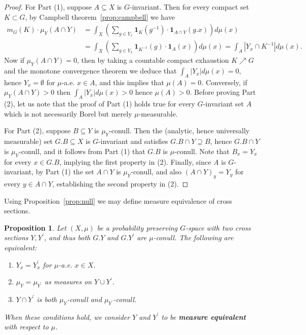 \documentclass{amsart}
\numberwithin{equation}{subsection}
\newtheorem{prop}[thm]{Proposition}
\theoremstyle{remark}
\begin{document}
\begin{proof}
For Part (1), suppose \(A\subseteq X\) is \(G\)-invariant. Then for every compact set \(K\subset G\), by Campbell theorem~\ref{prop:campbell} we have
\begin{align*}
m_{G}\left(K\right)\cdot\mu_{Y}\left(A\cap Y\right)	
&=\int_{X}\left(\sum\nolimits_{g\in Y_{x}}\mathbf{1}_{K}\left(g^{-1}\right)\cdot\mathbf{1}_{A\cap Y}\left(g.x\right)\right)d\mu\left(x\right)\\
&=\int_{X}\left(\sum\nolimits_{g\in Y_{x}}\mathbf{1}_{K^{-1}}\left(g\right)\cdot\mathbf{1}_{A}\left(x\right)\right)d\mu\left(x\right)=\int_{A}\left|Y_{x}\cap K^{-1}\right|d\mu\left(x\right).
\end{align*}
Now if \(\mu_{Y}\left(A\cap Y\right)=0\), then by taking a countable compact exhaustion \(K\nearrow G\) and the monotone convergence theorem we deduce that \(\int_{A}\left|Y_{x}\right|d\mu\left(x\right)=0\), hence \(Y_{x}=\emptyset\) for \(\mu\)-a.e. \(x\in A\), and this implies that \(\mu\left(A\right)=0\). Conversely, if \(\mu_{Y}\left(A\cap Y\right)>0\) then \(\int_{A}\left|Y_{x}\right|d\mu\left(x\right)>0\) hence \(\mu\left(A\right)>0\). Before proving Part (2), let us note that the proof of Part (1) holds true for every \(G\)-invariant set \(A\) which is not necessarily Borel but merely \(\mu\)-measurable.

For Part (2), suppose \(B\subseteq Y\) is \(\mu_{Y}\)-conull. Then the (analytic, hence universally measurable) set \(G.B\subseteq X\) is \(G\)-invariant and satisfies \(G.B\cap Y\supseteq B\), hence \(G.B\cap Y\) is \(\mu_{Y}\)-conull, and it follows from Part (1) that \(G.B\) is \(\mu\)-conull.  Note that \(B_{x}=Y_{x}\) for every \(x\in G.B\), implying the first property in (2). Finally, since \(A\) is \(G\)-invariant, by Part (1) the set \(A\cap Y\) is \(\mu_{Y}\)-conull, and also \(\left(A\cap Y\right)_{y}=Y_{y}\) for every \(y\in A\cap Y\), establishing the second property in (2).
\end{proof}

Using Proposition~\ref{prop:null} we may define measure equivalence of cross sections.

\begin{prop}\label{prop:crossequiv}
Let \(\left(X,\mu\right)\) be a probability preserving \(G\)-space with two cross sections \(Y,Y^{\prime}\), and thus both \(G.Y\) and \(G.Y^{\prime}\) are \(\mu\)-conull. The following are equivalent:
\begin{enumerate}
    \item \(Y_{x}=Y_{x}^{\prime}\) for \(\mu\)-a.e. \(x\in X\).
    \item \(\mu_{Y}=\mu_{Y^{\prime}}\) as measures on \(Y\cup Y^{\prime}\).
    \item \(Y\cap Y^{\prime}\) is both \(\mu_{Y}\)-conull and \(\mu_{Y^{\prime}}\)-conull.
\end{enumerate}
When these conditions hold, we consider \(Y\) and \(Y^{\prime}\) to be {\bf measure equivalent} with respect to \(\mu\).
\end{prop}
\end{document}

